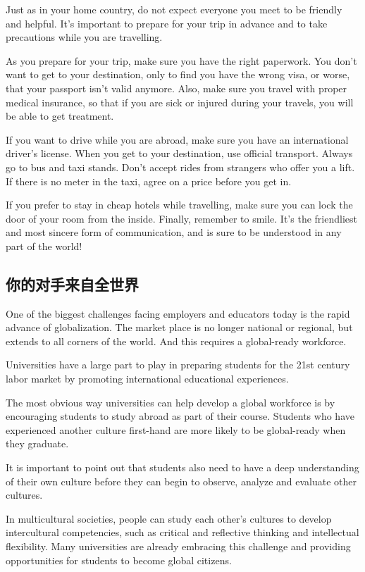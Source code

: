 Just as in your home country, do not expect everyone you
meet to be friendly and helpful. It's important to prepare
for your trip in advance and to take precautions while you
are travelling.

As you prepare for your trip, make sure you have the
right paperwork. You don't want to get to your destination,
only to find you have the wrong visa, or worse, that your
passport isn't valid anymore. Also, make sure you travel
with proper medical insurance, so that if you are sick or injured
during your travels, you will be able to get treatment.

If you want to drive while you are abroad, make sure you
have an international driver's license. When you get
to your destination, use official transport. Always go to bus
and taxi stands. Don't accept rides from strangers who
offer you a lift. If there is no meter in the taxi, agree on a
price before you get in.

If you prefer to stay in cheap hotels while travelling, make
sure you can lock the door of your room from the inside.
Finally, remember to smile. It's the friendliest and most sincere
form of communication, and is sure to be understood
in any part of the world!




\subsection{你的对手来自全世界}
One of the biggest challenges facing employers and
educators today is the rapid advance of globalization. The
market place is no longer national or regional, but extends
to all corners of the world. And this requires a global-ready
workforce.

Universities have a large part to play in preparing students
for the 21st century labor market by promoting international
educational experiences.

The most obvious way universities can help develop a
global workforce is by encouraging students to study
abroad as part of their course. Students who have 
experienced another culture first-hand are more likely to be
global-ready when they graduate.

It is important to point out that students also need to
have a deep understanding of their own culture before
they can begin to observe, analyze and evaluate other
cultures.

In multicultural societies, people can study each other's
cultures to develop intercultural competencies, such as
critical and reflective thinking and intellectual flexibility.
Many universities are already embracing this challenge
and providing opportunities for students to become global
citizens.

